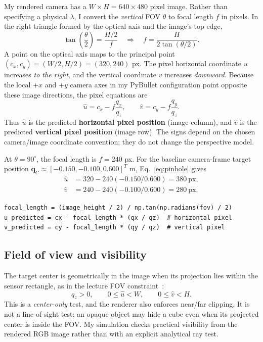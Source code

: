 \documentclass[11pt,letterpaper]{article}
\begin{document}
My rendered camera has a $W\times H=640\times480$ pixel image. Rather than specifying a physical $\lambda$, I convert the \emph{vertical} FOV $\theta$ to focal length $f$ in pixels. In the right triangle formed by the optical axis and the image's top edge,
\begin{equation}
\tan\!\left(\frac{\theta}{2}\right)=\frac{H/2}{f}
\quad\Longrightarrow\quad
\boxed{f=\frac{H}{2\tan(\theta/2)}.}\label{eq:focal}
\end{equation}
A point on the optical axis maps to the principal point $(c_x,c_y)=(W/2,H/2)=(320,240)$ px. The pixel horizontal coordinate $u$ increases \emph{to the right}, and the vertical coordinate $v$ increases \emph{downward}. Because the local $+x$ and $+y$ camera axes in my PyBullet configuration point opposite these image directions, the pixel equations are
\begin{equation}
\boxed{\hat u=c_x-f\frac{q_x}{q_z},\qquad
       \hat v=c_y-f\frac{q_y}{q_z}.}\label{eq:pinhole}
\end{equation}
Thus $\hat u$ is the predicted \textbf{horizontal pixel position} (image column), and $\hat v$ is the predicted \textbf{vertical pixel position} (image row). The signs depend on the chosen camera/image coordinate convention; they do not change the perspective model.

At $\theta=90^\circ$, the focal length is $f=240$ px. For the baseline camera-frame target position $\mathbf{q}_C\approx[-0.150,-0.100,0.600]^T$ m, Eq.~\eqref{eq:pinhole} gives
\begin{align}
\hat u&=320-240(-0.150/0.600)=380\ \mathrm{px},\nonumber\\
\hat v&=240-240(-0.100/0.600)=280\ \mathrm{px}.\label{eq:baseline}
\end{align}
\begin{lstlisting}[caption={FOV-to-focal-length conversion and image projection.},label={lst:projection}]
focal_length = (image_height / 2) / np.tan(np.radians(fov) / 2)
u_predicted = cx - focal_length * (qx / qz)  # horizontal pixel
v_predicted = cy - focal_length * (qy / qz)  # vertical pixel
\end{lstlisting}

\subsection{Field of view and visibility}
The target center is geometrically in the image when its projection lies within the sensor rectangle, as in the lecture FOV constraint~\cite[Eq.~(8)]{ferrari}:
\begin{equation}
q_z>0,\qquad 0\le\hat u<W,\qquad 0\le\hat v<H.\label{eq:fov}
\end{equation}
This is a \emph{center-only} test, and the renderer also enforces near/far clipping. It is not a line-of-sight test: an opaque object may hide a cube even when its projected center is inside the FOV. My simulation checks practical visibility from the rendered RGB image rather than with an explicit analytical ray test.
\end{document}
